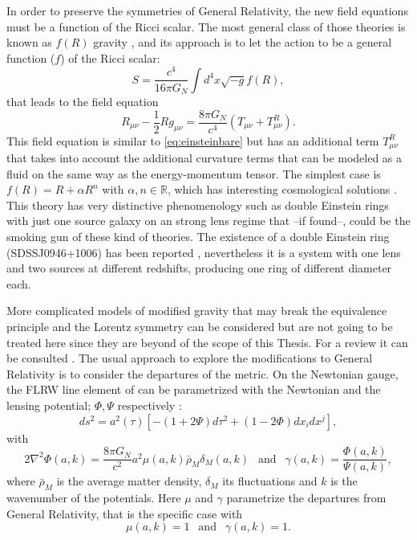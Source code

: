 In order to preserve the symmetries of General Relativity, the new field equations must be a function of the Ricci scalar. The most general class of those theories is known as $f(R)$ gravity \cite{2010LRR....13....3D,2010RvMP...82..451S}, and its approach is to let the action to be a general function ($f$) of the Ricci scalar:
\begin{equation}
S = \frac{c^4}{16\pi G_N}\int d^4x\sqrt{-g}f(R),
\end{equation}
that leads to the field equation
\begin{equation}
R_{\mu\nu}-\frac{1}{2}Rg_{\mu\nu}=\frac{8\pi G_N}{c^4}( T_{\mu\nu}+T_{\mu\nu}^R).
\end{equation}
This field equation is similar to \autoref{eq:einsteinbare} but has an additional term $T_{\mu\nu}^R$ that takes into account the additional curvature terms that can be modeled as a fluid on the same way as the energy-momentum tensor. The simplest case is $f(R) =R+\alpha R^n$ with $\alpha,n\in\mathbb{R}$, which has interesting cosmological solutions \cite{PhysRevD.85.083511}. This theory has very distinctive phenomenology such as double Einstein rings with just one source galaxy on an strong lens regime \cite{2011PhRvD..83b4030N} that --if found--, could be the smoking gun of these kind of theories. The existence of a double Einstein ring (SDSSJ0946+1006) has been reported \cite{2008ApJ...677.1046G}, nevertheless it is a system with one lens and two sources at different redshifts, producing one ring of different diameter each.
\newline

More complicated models of modified gravity that may break the equivalence principle and the Lorentz symmetry can be considered but are not going to be treated here since they are beyond of the scope of this Thesis. For a review it can be consulted \cite{2015CQGra..32x3001B}. The usual approach to explore the modifications to General Relativity \cite{2015PhRvD..91h3504L} is to consider the departures of the metric. On the Newtonian gauge, the FLRW line element of can be parametrized with the Newtonian and the lensing potential; $\Phi,\Psi$ respectively \cite{2015PhRvD..91h3504L}:
\begin{equation}
ds^2 = a^2(\tau)[-(1+2\Psi)d\tau^2+(1-2\Phi)dx_idx^j],
\end{equation}
with
\begin{equation}
2\nabla^2\Phi(a,k) = \frac{8\pi G_N}{c^2}a^2\mu(a,k)\bar \rho_M\delta_M(a,k)\ \ \mbox{ and }\ \ \gamma(a,k)=\frac{\Phi(a,k)}{\Psi(a,k)},
\end{equation}
where $\bar \rho_M$ is the average matter density, $\delta_M$ its fluctuations and $k$ is the wavenumber of the potentials. Here $\mu$ and $\gamma$ parametrize the departures from General Relativity, that is the specific case with
\begin{equation}
\mu(a,k) = 1\ \ \mbox{ and }\ \ \gamma(a,k) = 1.
\end{equation}

